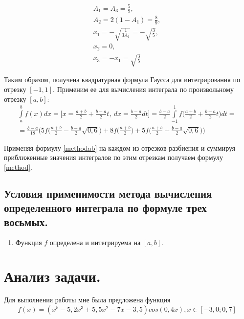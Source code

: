 \documentclass[a4paper, 12pt]{article}
\begin{document}
	\begin{equation}
		\begin{gathered}
			A_1=A_3=\frac{5}{9},\\
			A_2=2(1-A_1)=\frac{8}{9},\\
			x_1=-\sqrt{\frac{1}{3A_1}}=-\sqrt{\frac{3}{5}},\\
			x_2=0,\\
			x_3=-x_1=\sqrt{\frac{3}{5}}
		\end{gathered}
	\end{equation}

	Таким образом, получена квадратурная формула Гаусса для интегрирования по отрезку $[-1,1]$. Применим ее для вычисления интеграла по произвольному отрезку $[a,b]$:
	\begin{equation} \label{methodab}
		\begin{gathered}
			\int\limits_a^bf(x)dx=\bigg[x=\frac{a+b}{2}+\frac{b-a}{2}t,\ dx=\frac{b-a}{2}dt\bigg]=\frac{b-a}{2}\int\limits_{-1}^1f\bigg(\frac{a+b}{2}+\frac{b-a}{2}t\bigg)dt=\\=
			\frac{b-a}{18}\bigg(5f\bigg(\frac{a+b}{2}-\frac{b-a}{2}\sqrt{0,6}\bigg)+8f\bigg(\frac{a+b}{2}\bigg)+5f\bigg(\frac{a+b}{2}+\frac{b-a}{2}\sqrt{0,6}\bigg)\bigg)
		\end{gathered}
	\end{equation}

	Применяя формулу \eqref{methodab} на каждом из отрезков разбиения и суммируя приближенные значения интегралов по этим отрезкам получаем формулу \eqref{method}.
	
	\subsection{Условия применимости метода вычисления определенного интеграла по формуле трех восьмых.}
	
	\begin{enumerate}
		\item Функция $f$ определена и интегрируема на $[a,b]$.
	\end{enumerate}
	
	\section{Анализ задачи.}
	
	Для выполнения работы мне была предложена функция
	\begin{equation} \label{f}
		f(x)=(x^5-5,2x^3+5,5x^2-7x-3,5)cos(0,4x), x\in[-3,0;0,7]
	\end{equation}
	
\end{document}
